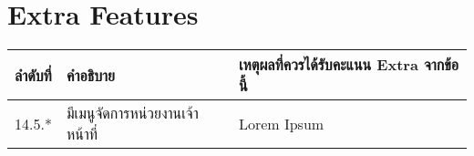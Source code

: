 \section{Extra Features}

\begin{tabularx}{\textwidth}{ l l l }
ลำดับที่    & คำอธิบาย & เหตุผลที่ควรได้รับคะแนน Extra จากข้อนี้ \\
    \hline
14.5.*    & มีเมนูจัดการหน่วยงานเจ้าหน้าที่               & Lorem Ipsum
\end{tabularx}

